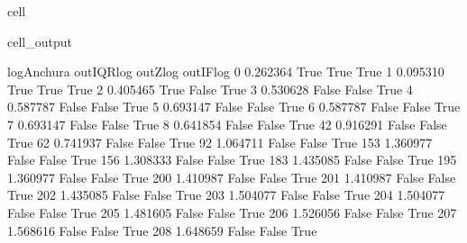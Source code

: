 \documentclass[a4paper,10pt,spanish]{jupyterBook}
\begin{document}
\begin{sphinxuseclass}{cell}
\begin{sphinxVerbatimOutput}
\begin{sphinxuseclass}{cell_output}
\begin{sphinxVerbatim}[commandchars=\\\{\}]
     log\PYGZus{}Anchura  out\PYGZus{}IQR\PYGZus{}log  out\PYGZus{}Z\PYGZus{}log  out\PYGZus{}IF\PYGZus{}log
0       0.262364         True       True        True
1       0.095310         True       True        True
2       0.405465         True      False        True
3       0.530628        False      False        True
4       0.587787        False      False        True
5       0.693147        False      False        True
6       0.587787        False      False        True
7       0.693147        False      False        True
8       0.641854        False      False        True
42      0.916291        False      False        True
62      0.741937        False      False        True
92      1.064711        False      False        True
153     1.360977        False      False        True
156     1.308333        False      False        True
183     1.435085        False      False        True
195     1.360977        False      False        True
200     1.410987        False      False        True
201     1.410987        False      False        True
202     1.435085        False      False        True
203     1.504077        False      False        True
204     1.504077        False      False        True
205     1.481605        False      False        True
206     1.526056        False      False        True
207     1.568616        False      False        True
208     1.648659        False      False        True
\end{sphinxVerbatim}

\end{sphinxuseclass}\end{sphinxVerbatimOutput}

\end{sphinxuseclass}
\end{document}
